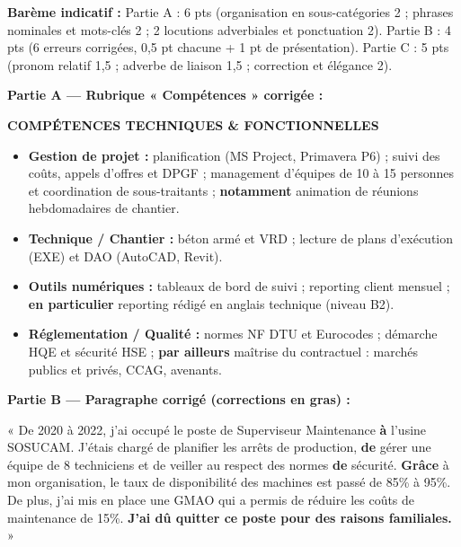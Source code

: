 \documentclass[11pt]{article}
\begin{document}
\begin{corrige}
\textbf{Barème indicatif :} Partie A : 6 pts (organisation en sous-catégories 2 ; phrases nominales et mots-clés 2 ; 2 locutions adverbiales et ponctuation 2). Partie B : 4 pts (6 erreurs corrigées, 0,5 pt chacune + 1 pt de présentation). Partie C : 5 pts (pronom relatif 1,5 ; adverbe de liaison 1,5 ; correction et élégance 2).

\textbf{Partie A — Rubrique « Compétences » corrigée :}

\textbf{COMPÉTENCES TECHNIQUES \& FONCTIONNELLES}
\begin{itemize}
\item \textbf{Gestion de projet :} planification (MS Project, Primavera P6) ; suivi des coûts, appels d'offres et DPGF ; management d'équipes de 10 à 15 personnes et coordination de sous-traitants ; \textbf{notamment} animation de réunions hebdomadaires de chantier.
\item \textbf{Technique / Chantier :} béton armé et VRD ; lecture de plans d'exécution (EXE) et DAO (AutoCAD, Revit).
\item \textbf{Outils numériques :} tableaux de bord de suivi ; reporting client mensuel ; \textbf{en particulier} reporting rédigé en anglais technique (niveau B2).
\item \textbf{Réglementation / Qualité :} normes NF DTU et Eurocodes ; démarche HQE et sécurité HSE ; \textbf{par ailleurs} maîtrise du contractuel : marchés publics et privés, CCAG, avenants.
\end{itemize}

\textbf{Partie B — Paragraphe corrigé (corrections en gras) :}

« De 2020 à 2022, j'ai occupé le poste de Superviseur Maintenance \textbf{à} l'usine SOSUCAM. J'étais chargé de planifier les arrêts de production, \textbf{de} gérer une équipe de 8 techniciens et de veiller au respect des normes \textbf{de} sécurité. \textbf{Grâce} à mon organisation, le taux de disponibilité des machines est passé de 85\% à 95\%. De plus, j'ai mis en place une GMAO qui a permis de réduire les coûts de maintenance de 15\%. \textbf{J'ai dû quitter ce poste pour des raisons familiales.} »


\end{corrige}
\end{document}
